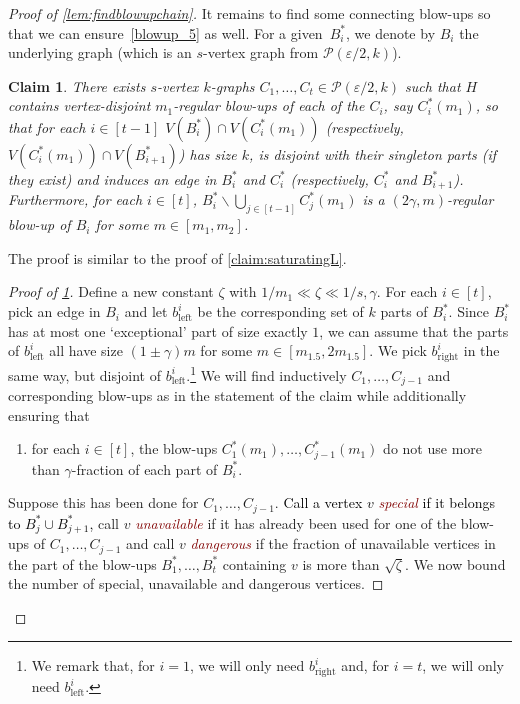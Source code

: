 \documentclass[12pt,reqno]{amsart}
\theoremstyle{plain}
\newtheorem{claim}[theorem]{Claim}
\theoremstyle{definition}
\numberwithin{equation}{section}
\newcommand{\fw}[1]{\textcolor{black}{#1}}
\renewcommand{\setminus}{\smallsetminus}
\newcommand{\defn}[1]{\textcolor{Maroon}{\emph{#1}}}
\newcommand{\eps}{\varepsilon}
\begin{document}
\begin{proof}[Proof of \cref{lem:findblowupchain}]
		It remains to find some connecting blow-ups so that we can ensure~\ref{blowup_5} as well. For a given~$B_i^*$, we denote by $B_i$ the underlying graph (which is an $s$-vertex graph from $\mathcal{P}(\eps/2,k)$).
		
		\begin{claim}\label{claim:glue}
			There exists $s$-vertex $k$-graphs $C_1,\dotsc, C_t \in \mathcal{P}(\eps/2, k)$ such that $H$ contains vertex-disjoint $m_1$-regular blow-ups of each of the $C_i$, say $C_i^\ast(m_1)$, so that for each $i\in [t-1]$
			$V(B_i^\ast)\cap  V(C_i^\ast(m_1))$ \textup{(}respectively,  $V(C_i^\ast(m_1))\cap  V(B_{i+1}^\ast)$\textup{)} has size $k$, is disjoint with their singleton parts \textup{(}if they exist\textup{)} and induces an edge in $B_i^\ast$ and $C_i^\ast$ \textup{(}respectively, $C_i^\ast$ and $B_{i+1}^\ast$\textup{)}. Furthermore, for each $i\in [t]$, $B_i^\ast\setminus \bigcup_{j\in [t-1]} C_j^\ast(m_1)$ is a $(2\gamma, m)$-regular blow-up of $B_i$ for some $m\in [m_1,m_2]$.
		\end{claim}
		
		The proof is similar to the proof of \cref{claim:saturatingL}.
		\begin{proof}[Proof of \cref{claim:glue}]
			Define a new constant $\zeta$ with $1/m_1\ll \zeta \ll 1/s,\gamma$.
			For each $i\in [t]$, pick an edge in $B_i$ and let $b_{\text{left}}^i$ be the corresponding set of $k$ parts of $B_i^\ast$.
			Since  $B_i^\ast$ has at most one `exceptional' part of size exactly $1$, we can assume that the parts of  $b_{\text{left}}^i$ all have size $(1\pm\gamma)m$ for some $m \in [m_{1.5},2m_{1.5}]$.
			We pick $b_{\text{right}}^i$ in the same way, but disjoint of $b_{\text{left}}^i$.\footnote{We remark that, for $i=1$, we will only need $b_{\text{right}}^i$ and, for $i=t$, we will only need $b_{\text{left}}^i$.}
			We will find inductively $C_1, \dotsc, C_{j-1}$ and corresponding blow-ups as in the statement of the claim while additionally ensuring that
			\begin{enumerate}[label = (\alph*)]
				\item  \label{item:claim_dangerous} for each $i\in [t]$, the blow-ups $C_1^\ast(m_1), \dots, C_{j-1}^\ast(m_1)$ do not use more than $\gamma$-fraction of each part of $B_i^\ast$.
			\end{enumerate}
			
			Suppose this has been done for $C_1, \dots, C_{j-1}$.
			\fw{Call a vertex $v$ \defn{special} if it belongs to $B_j^\ast \cup B_{j+1}^\ast$,} call $v$ \defn{unavailable} if it has already been used for one of the blow-ups of $C_1, \dots, C_{j-1}$ and call $v$ \defn{dangerous} if the fraction of unavailable vertices in the part of the blow-ups $B_1^\ast, \dots, B_t^\ast$ containing $v$ is more than $\sqrt{\zeta}$.
			We now bound the number of special, unavailable and dangerous vertices.
			

\end{proof}
\end{proof}
\end{document}
